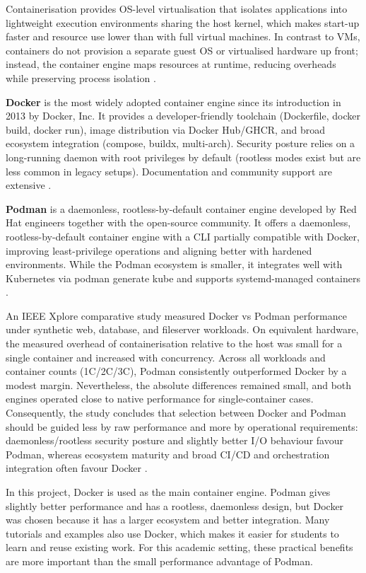 Containerisation provides OS-level virtualisation that isolates applications into lightweight execution environments sharing the host kernel, which makes start-up faster and resource use lower than with full virtual machines. In contrast to VMs, containers do not provision a separate guest OS or virtualised hardware up front; instead, the container engine maps resources at runtime, reducing overheads while preserving process isolation \parencite{Performa22:online}.

\textbf{Docker} is the most widely adopted container engine since its introduction in 2013 by Docker, Inc. It provides a developer-friendly toolchain (Dockerfile, docker build, docker run), image distribution via Docker Hub/GHCR, and broad ecosystem integration (compose, buildx, multi-arch). Security posture relies on a long-running daemon with root privileges by default (rootless modes exist but are less common in legacy setups). Documentation and community support are extensive \parencite{DockerDo74:online}.

\textbf{Podman} is a daemonless, rootless-by-default container engine developed by Red Hat engineers together with the open-source community. It offers a daemonless, rootless-by-default container engine with a CLI partially compatible with Docker, improving least-privilege operations and aligning better with hardened environments. While the Podman ecosystem is smaller, it integrates well with Kubernetes via podman generate kube and supports systemd-managed containers \parencite{Performa22:online}.

An IEEE Xplore comparative study measured Docker vs Podman performance under synthetic web, database, and fileserver workloads. On equivalent hardware, the measured overhead of containerisation relative to the host was small for a single container and increased with concurrency. Across all workloads and container counts (1C/2C/3C), Podman consistently outperformed Docker by a modest margin. Nevertheless, the absolute differences remained small, and both engines operated close to native performance for single-container cases. Consequently, the study concludes that selection between Docker and Podman should be guided less by raw performance and more by operational requirements: daemonless/rootless security posture and slightly better I/O behaviour favour Podman, whereas ecosystem maturity and broad CI/CD and orchestration integration often favour Docker \parencite{Performa22:online,DockerDo74:online}.

In this project, Docker is used as the main container engine. Podman gives slightly better performance and has a rootless, daemonless design, but Docker was chosen because it has a larger ecosystem and better integration. Many tutorials and examples also use Docker, which makes it easier for students to learn and reuse existing work. For this academic setting, these practical benefits are more important than the small performance advantage of Podman.

